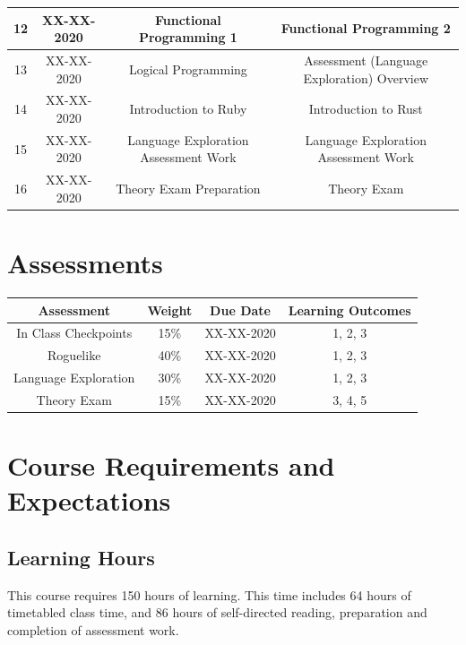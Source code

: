 \documentclass{article}
\begin{document}
\begin{tabular}{|c|c|c|c|}
	12            & XX-XX-2020    & Functional Programming 1              & Functional Programming 2                   \\ \hline
	13            & XX-XX-2020    & Logical Programming                   & Assessment (Language Exploration) Overview \\ \hline
	14            & XX-XX-2020    & Introduction to Ruby                  & Introduction to Rust                       \\ \hline
	15            & XX-XX-2020    & Language Exploration Assessment Work  & Language Exploration Assessment Work       \\ \hline
	16            & XX-XX-2020    & Theory Exam Preparation               & Theory Exam                                \\ \hline
\end{tabular}

\section*{Assessments}
\renewcommand{\arraystretch}{1.5}
\begin{tabular}{|c|c|c|c|}
	\hline
	\textbf{Assessment}  & \textbf{Weight} & \textbf{Due Date} & \textbf{Learning Outcomes} \\ \hline
	In Class Checkpoints & 15\%            & XX-XX-2020        & 1, 2, 3                    \\ \hline
	Roguelike            & 40\%            & XX-XX-2020        & 1, 2, 3                    \\ \hline
	Language Exploration & 30\%            & XX-XX-2020        & 1, 2, 3                    \\ \hline
	Theory Exam          & 15\%            & XX-XX-2020        & 3, 4, 5                    \\ \hline
\end{tabular}

\section*{Course Requirements and Expectations}

\subsection*{Learning Hours}
This course requires 150 hours of learning. This time includes 64 hours of timetabled class time, and 86 hours of self-directed reading, preparation and completion of assessment work.
\end{document}
